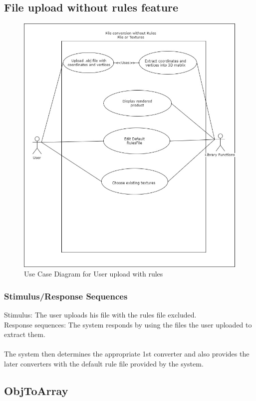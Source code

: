 \documentclass[english]{article}
\begin{document}
			 \subsection{File upload without rules feature}
				\begin{figure}[h]
					\includegraphics[width=\textwidth]{Use Cases/NoTexturesNoRules.jpg}
					\caption{Use Case Diagram for User upload with rules }
				\end{figure}
			 \subsubsection{Stimulus/Response Sequences}
			 	Stimulus: The user uploads his file with the rules file excluded.\\
			 	Response sequences: The system responds by using the files the user uploaded to extract them.\\\\
			 	 The system then determines the appropriate 1st converter and also provides the later converters with the default rule file provided by the system. 
	\pagebreak
	
		\subsection{ObjToArray}
\end{document}
